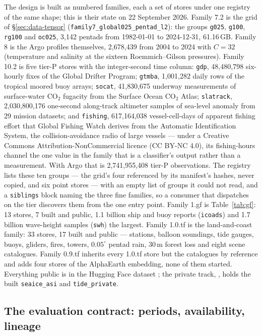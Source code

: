 \documentclass[10pt]{article}
\newcommand{\code}[1]{\texttt{#1}}
\begin{document}
The design is built as numbered families, each a set of stores under one
registry of the same shape; this is their state on 22 September 2026. Family
7.2 is the grid of \S\ref{sec:data-tensor}
(\code{family7\_global025\_pentad\_l2}): the groups \code{g025},
\code{g100}, \code{rg100} and \code{oc025}, 3{,}142 pentads from 1982-01-01
to 2024-12-31, 61.16\,GB. Family 8 is the Argo profiles themselves,
2{,}678{,}439 from 2004 to 2024 with $C=32$ (temperature and salinity at the
sixteen Roemmich--Gilson pressures). Family 10.2 is five tier-P stores with
the integer-second time column: \code{gdp}, 48{,}480{,}798 six-hourly fixes
of the Global Drifter Program; \code{gtmba}, 1{,}001{,}282 daily rows of the
tropical moored buoy arrays; \code{socat}, 41{,}830{,}675 underway
measurements of surface-water CO$_2$ fugacity from the Surface Ocean CO$_2$
Atlas; \code{slatrack}, 2{,}030{,}800{,}176 one-second along-track altimeter
samples of sea-level anomaly from 29 mission datasets; and \code{fishing},
617{,}164{,}038 vessel-cell-days of apparent fishing effort that Global
Fishing Watch derives from the Automatic Identification System, the
collision-avoidance radio of large vessels --- under a Creative Commons
Attribution-NonCommercial licence (CC BY-NC 4.0), its fishing-hours channel
the one value in the family that is a classifier's output rather than a
measurement. With Argo
that is 2{,}741{,}955{,}408 tier-P observations. The registry
 lists these ten groups --- the grid's
four referenced by its manifest's hashes, never copied, and six point stores
--- with an empty list of groups it could not read, and a \code{siblings}
block naming the three fine families, so a consumer that dispatches on the
tier discovers them from the one entry point. Family 1.gf is
Table~\ref{tab:gf}: 13 stores, 7 built and public, 1.1 billion ship and buoy
reports (\code{icoads}) and 1.7 billion wave-height samples (\code{swh})
the largest. Family 1.0.tf is the land-and-coast family: 33 stores, 17 built
and public --- stations, balloon soundings, tide gauges, buoys, gliders,
fires, towers, $0.05^\circ$ pentad rain, 30\,m forest loss and eight scene
catalogues. Family 0.9.tf inherits every 1.0.tf store but the catalogues by
reference and adds four stores of the AlphaEarth embedding, none of them
started. Everything public is in the Hugging Face dataset
; the private track,
, holds the built \code{seaice\_asi} and
\code{tide\_private}.

\subsection{The evaluation contract: periods, availability,
lineage}\label{sec:data-split}
\end{document}
